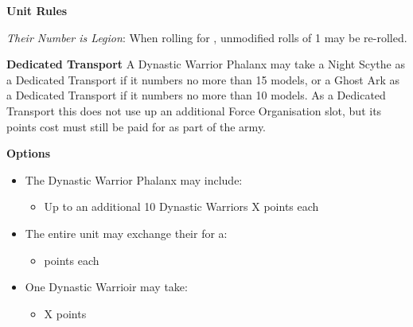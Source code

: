 \begin{minipage}[t]{0.72\textwidth}
	\vspace*{2em}
	\textbf{Unit Rules}
	
	\textit{Their Number is Legion}: When rolling for , unmodified rolls of 1 may be re-rolled.


	\vspace*{2em}
	\textbf{Dedicated Transport}
	A Dynastic Warrior Phalanx may take a Night Scythe as a Dedicated Transport if it numbers no more than 15 models, or a Ghost Ark as a Dedicated Transport if it numbers no more than 10 models. As a Dedicated Transport this does not use up an additional Force Organisation slot, but its points cost must still be paid for as part of the army.

	\vspace*{2em}
	\textbf{Options}
	\begin{itemize}
		\item The Dynastic Warrior Phalanx may include:
		\begin{itemize}
			\item Up to an additional 10 Dynastic Warriors \dotfill X points each
		\end{itemize}
		\item The entire unit may exchange their  for a:
		\begin{itemize}
			\item {}  points each
		\end{itemize}
		\item One Dynastic Warrioir may take:
		\begin{itemize}
			\item {} \dotfill X points
		\end{itemize} 
	\end{itemize}
\end{minipage}


\newpage
